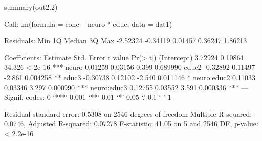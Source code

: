 \begin{Schunk}
\begin{Sinput}
 summary(out2.2)
\end{Sinput}
\begin{Soutput}
Call:
lm(formula = conc ~ neuro * educ, data = dat1)

Residuals:
     Min       1Q   Median       3Q      Max 
-2.52324 -0.34119  0.01457  0.36247  1.86213 

Coefficients:
            Estimate Std. Error t value Pr(>|t|)    
(Intercept)  3.72924    0.10864  34.326  < 2e-16 ***
neuro        0.01259    0.03156   0.399 0.689990    
educ2       -0.32892    0.11497  -2.861 0.004258 ** 
educ3       -0.30738    0.12102  -2.540 0.011146 *  
neuro:educ2  0.11033    0.03346   3.297 0.000990 ***
neuro:educ3  0.12755    0.03552   3.591 0.000336 ***
---
Signif. codes:  0 ‘***’ 0.001 ‘**’ 0.01 ‘*’ 0.05 ‘.’ 0.1 ‘ ’ 1

Residual standard error: 0.5308 on 2546 degrees of freedom
Multiple R-squared:  0.0746,	Adjusted R-squared:  0.07278 
F-statistic: 41.05 on 5 and 2546 DF,  p-value: < 2.2e-16
\end{Soutput}
\end{Schunk}
